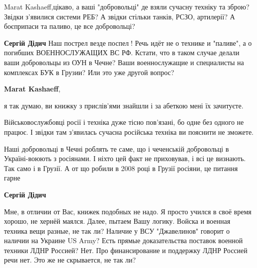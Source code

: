 \begin{itemize}
\begin{itemize}
Marat Kashaeff,цікаво, а ваші "добровольці" де взяли сучасну техніку та зброю?
Звідки з'явилися системи РЕБ? А звідки стільки танків, РСЗО, артилерії? А
боєприпаси та паливо, це все добровольці?


 
\textbf{Сергій Дідич} Наш пострел везде поспел🤣! Речь идёт не о технике и
"паливе", а о погибших ВОЕННОСЛУЖАЩИХ ВС РФ. Кстати, что в таком случае делали
ваши добровольцы из ОУН в Чечне? Ваши военнослужащие и специалисты на
комплексах БУК в Грузии? Или это уже другой вопрос?

 
\textbf{Marat Kashaeff}, 

я так думаю, ви книжку з прислів'ями знайшли і за абеткою мені їх зачитуєте.

Військовослужбовці росії і техніка дуже тісно пов'язані, бо одне без одного не
працює. І звідки там з'явилась сучасна російська техніка ви пояснити не
зможете.

Наші добровольці в Чечні роблять те саме, що і чеченській добровольці в
Україні-воюють з росіянами. І ніхто цей факт не приховував, і всі це визнають.
Так само і в Грузії. А от що робили в 2008 році в Грузії росіяни, це питання
гарне

 
\textbf{Сергій Дідич} 

Мне, в отличии от Вас, книжек подобных не надо. Я просто учился в своё время
хорошо, не хернёй маялся. Далее, пытаем Вашу логику. Войска и военная техника
вещи разные, не так ли? Наличие у ВСУ "Джавелинов" говорит о наличии на Украине
US Army? Есть прямые доказательства поставок военной техники ЛДНР Россией? Нет.
Про финансирование и поддержку ЛДНР Россией речи нет. Это же не скрывается, не
так ли? 


\end{itemize}
\end{itemize}
